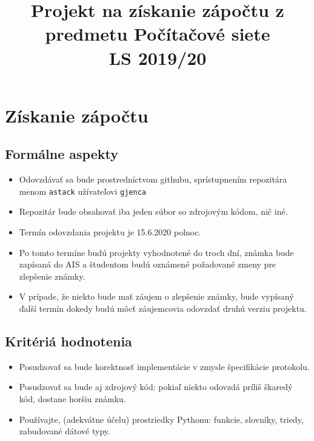 \documentclass[11pt]{article}
\theoremstyle{definition}
\begin{document}
\title{Projekt na získanie zápočtu z predmetu Počítačové siete\\LS 2019/20}
\maketitle
\section{Získanie zápočtu}
\subsection{Formálne aspekty}

\begin{itemize}
\item Odovzdávať sa bude prostredníctvom githubu, sprístupnením repozitára menom {\tt astack} užívateľovi {\tt gjenca}
\item Repozitár bude obsahovať iba jeden súbor so zdrojovým kódom, nič iné.
\item Termín odovzdania projektu je 15.6.2020 polnoc.
\item Po tomto termíne budú projekty vyhodnotené do troch dní, známka bude zapísaná do AIS a študentom budú oznámené
požadované zmeny pre zlepšenie známky.
\item V prípade, že niekto bude mať záujem o zlepšenie známky, bude vypísaný ďalší termín dokedy budú môcť záujemcovia
odovzdať druhú verziu projektu.
\end{itemize}

\subsection{Kritériá hodnotenia}
\begin{itemize}
\item Posudzovať sa bude korektnosť implementácie v zmysle špecifikácie protokolu.
\item Posudzovať sa bude aj zdrojový kód: pokiaľ niekto odovzdá príliš škaredý kód, dostane horšiu známku.
\item Používajte, (adekvátne účelu) prostriedky Pythonu: funkcie, slovníky, triedy, zabudované dátové typy.
\end{itemize}
\end{document}
